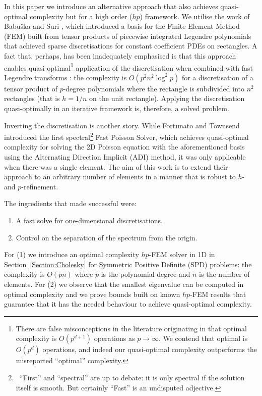 \documentclass[hidelinks,onefignum,onetabnum]{siamart220329}
\def\secref#1{Section~\ref{Section:#1}}
\begin{document}
	In this paper we introduce an alternative approach that also achieves quasi-optimal complexity but for a high order ($hp$) framework. We utilise the work of Babu{\v{s}}ka and Suri \cite{babuvska1991efficient}, which introduced a basis for the Finite Element Method (FEM) built from tensor products of piecewise integrated Legendre polynomials  that achieved sparse discretisations  for constant  coefficient PDEs on rectangles. A fact that, perhaps, has  been inadequately emphasised is that  this approach enables quasi-optimal\footnote{There are false misconceptions in the literature originating in \cite{orszag1979spectral} that optimal complexity is $O(p^{d+1})$ operations as $p \rightarrow \infty$. We contend that optimal is $O(p^d)$ operations, and indeed our quasi-optimal complexity outperforms the misreported ``optimal'' complexity.} application of the discretisation when  combined with fast Legendre transforms \cite{alpert1991fast,keiner2011fast,townsend2018fast}: the complexity is $O(p^2 n^2 \log^2 p)$ for a discretisation of a tensor product of $p$-degree polynomials where the rectangle is subdivided into $n^2$ rectangles (that is $h = 1/n$ on the unit rectangle). Applying the discretisation quasi-optimally in an iterative framework is, therefore, a solved problem.

Inverting the discretisation is another story.  While Fortunato and Townsend \cite{fortunato2020fast}  introduced the first spectral\footnote{\, ``First'' and ``spectral'' are up to debate: it is only spectral if the solution itself is smooth. But certainly ``Fast'' is an undisputed adjective.} Fast Poisson Solver, which achieves quasi-optimal complexity  for solving the 2D Poisson equation with the aforementioned basis using the Alternating Direction Implicit (ADI) method, it was only  applicable when there was a single element. The aim of this work is to extend their approach to an arbitrary number of elements in a manner that is robust to $h$- and $p$-refinement.

The ingredients that made \cite{fortunato2020fast} successful were:
\begin{enumerate}
\item A fast solve for one-dimensional discretisations.
\item Control on the separation of the spectrum from the origin. 
\end{enumerate}
For (1) we introduce an optimal complexity $hp$-FEM solver in 1D in \secref{Cholesky} for Symmetric Positive Definite (SPD) problems: the complexity is $O(p n)$ where $p$ is the polynomial degree and $n$ is the number of elements.  For (2) we observe that the smallest eigenvalue can be computed in optimal complexity and we prove bounds built on known $hp$-FEM results that guarantee that it has the needed behaviour to achieve quasi-optimal complexity. 
\end{document}
